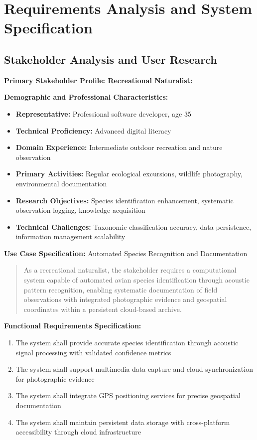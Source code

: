 \chapter{Requirements Analysis and System Specification}


\section{Stakeholder Analysis and User Research}

\textbf{Primary Stakeholder Profile: Recreational Naturalist:}

\textbf{Demographic and Professional Characteristics:}
\begin{itemize}
    \item \textbf{Representative:} Professional software developer, age 35
    \item \textbf{Technical Proficiency:} Advanced digital literacy
    \item \textbf{Domain Experience:} Intermediate outdoor recreation and nature observation
    \item \textbf{Primary Activities:} Regular ecological excursions, wildlife photography, environmental documentation
    \item \textbf{Research Objectives:} Species identification enhancement, systematic observation logging, knowledge acquisition
    \item \textbf{Technical Challenges:} Taxonomic classification accuracy, data persistence, information management scalability
\end{itemize}

\textbf{Use Case Specification:} Automated Species Recognition and Documentation
\begin{quote}
As a recreational naturalist, the stakeholder requires a computational system capable of automated avian species identification through acoustic pattern recognition, enabling systematic documentation of field observations with integrated photographic evidence and geospatial coordinates within a persistent cloud-based archive.
\end{quote}

\textbf{Functional Requirements Specification:}
\begin{enumerate}
    \item The system shall provide accurate species identification through acoustic signal processing with validated confidence metrics
    \item The system shall support multimedia data capture and cloud synchronization for photographic evidence
    \item The system shall integrate GPS positioning services for precise geospatial documentation
    \item The system shall maintain persistent data storage with cross-platform accessibility through cloud infrastructure
\end{enumerate}

